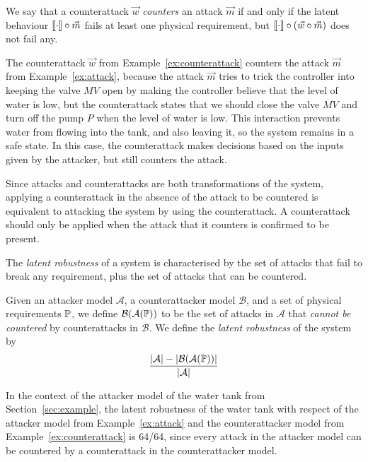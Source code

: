 {\begin{definition}
  We say that a counterattack $\vec{w}$ \emph{counters} an attack $\vec{m}$ if and only if the latent behaviour ${{{\llbracket\cdot\rrbracket}}}\circ\vec{m}$ fails at least one physical requirement, but ${{{\llbracket\cdot\rrbracket}}}\circ(\vec{w}\circ\vec{m})$ does not fail any.
\end{definition}
\begin{example}
  The counterattack $\vec{w}$ from Example~\ref{ex:counterattack} counters the attack $\vec{m}$ from Example~\ref{ex:attack}, because the attack $\vec{m}$ tries to trick the controller into keeping the valve $MV$ open by making the controller believe that the level of water is low, but the counterattack states that we should close the valve $MV$ and turn off the pump $P$ when the level of water is low. This interaction prevents water from flowing into the tank, and also leaving it, so the system remains in a safe state. In this case, the counterattack makes decisions based on the inputs given by the attacker, but still counters the attack.
\end{example}
Since attacks and counterattacks are both transformations of the system, applying a counterattack in the absence of the attack to be countered is equivalent to attacking the system by using the counterattack. A counterattack should only be applied when the attack that it counters is confirmed to be present. 

The \emph{latent robustness} of a system is characterised by the set of attacks that fail to break any requirement, plus the set of attacks that can be countered.
\begin{definition}
  \label{def:LatentRobustness}
  Given an attacker model $\mathcal{A}$, a counterattacker model $\mathcal{B}$, and a set of physical requirements $\mathbb{P}$, we define $\mathcal{B}(\mathcal{A}(\mathbb{P}))$ to be the set of attacks in $\mathcal{A}$ that \emph{cannot be countered} by counterattacks in $\mathcal{B}$. We define the \emph{latent robustness} of the system by 
  \begin{align*}
    \frac{|\mathcal{A}|-|\mathcal{B}(\mathcal{A}(\mathbb{P}))|}{|\mathcal{A}|}
  \end{align*}
\end{definition}

\begin{example}
  In the context of the attacker model of the water tank from Section~\ref{sec:example}, the latent robustness of the water tank with respect of the attacker model from Example~\ref{ex:attack} and the counterattacker model from Example~\ref{ex:counterattack} is 64/64, since every attack in the attacker model can be countered by a counterattack in the counterattacker model.
\end{example}

}
